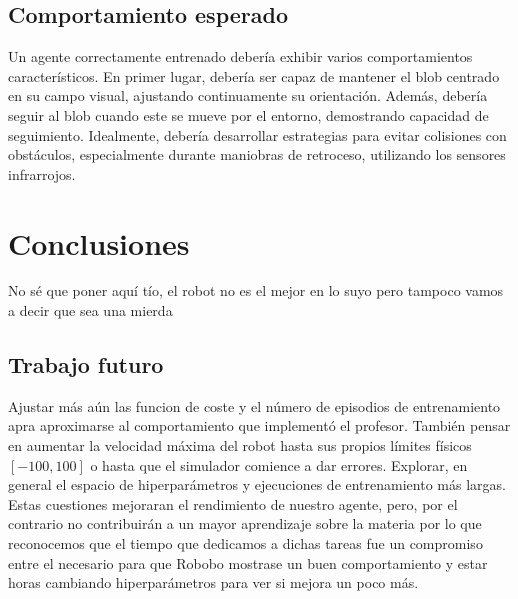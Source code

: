 \documentclass[12pt,a4paper]{article}
\begin{document}
\subsection{Comportamiento esperado}

Un agente correctamente entrenado debería exhibir varios comportamientos
característicos. En primer lugar, debería ser capaz de mantener el blob centrado
en su campo visual, ajustando continuamente su orientación. Además, debería
seguir al blob cuando este se mueve por el entorno, demostrando
capacidad de seguimiento. 
Idealmente, debería desarrollar estrategias para evitar colisiones con
obstáculos, especialmente durante maniobras de retroceso, utilizando
los sensores infrarrojos.

\section{Conclusiones}

No sé que poner aquí tío, el robot no es el mejor en lo suyo pero tampoco vamos a decir que sea una mierda

\subsection{Trabajo futuro}

Ajustar más aún las funcion de coste y el número  de episodios de entrenamiento
apra aproximarse al comportamiento que implementó el profesor. También pensar en
aumentar la velocidad máxima del robot hasta sus propios límites físicos
$[-100,100]$ o hasta que el simulador comience a dar errores.
Explorar, en general el espacio de hiperparámetros y ejecuciones de entrenamiento más largas. Estas cuestiones mejoraran el rendimiento de nuestro agente, pero, por el contrario no contribuirán a un mayor aprendizaje sobre la materia por lo que reconocemos que el tiempo que dedicamos a dichas tareas fue un compromiso entre el necesario para que Robobo mostrase un buen comportamiento y estar horas cambiando hiperparámetros para ver si mejora un poco más. 
\end{document}
